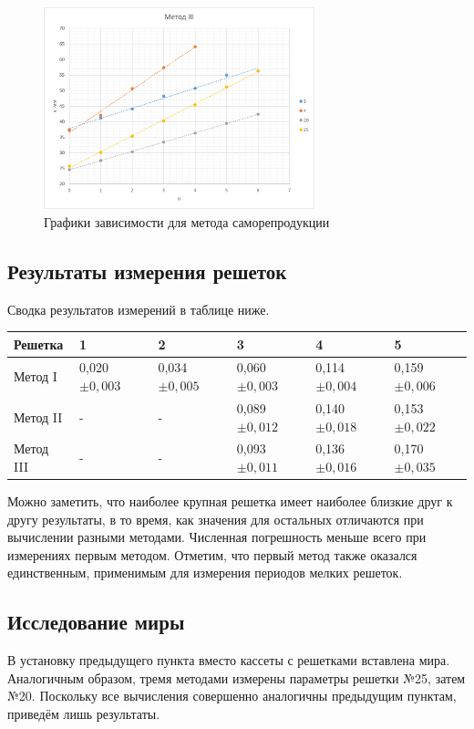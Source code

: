 \begin{figure}[H]
    \centering
    \includegraphics[width=0.7\textwidth]{img/plot.png}
    \caption{Графики зависимости для метода саморепродукции}
    \label{fig:plot}
\end{figure}

\subsection{Результаты измерения решеток}
Сводка результатов измерений в таблице ниже. 

\begin{table}[!ht]
    \centering
    \begin{tabular}{|l|l|l|l|l|l|}
    \hline
        Решетка & 1 & 2 & 3 & 4 & 5 \\ \hline
        Метод I & 0,020$\pm0,003$ & 0,034$\pm0,005$ & 0,060$\pm0,003$ & 0,114$\pm0,004$ & 0,159$\pm0,006$ \\ \hline
        Метод II & - & - & 0,089$\pm0,012$ & 0,140$\pm0,018$  & 0,153$\pm0,022$ \\ \hline
        Метод III & - & - & 0,093$\pm0,011$ & 0,136$\pm0,016$ & 0,170$\pm0,035$ \\ \hline
    \end{tabular}
\end{table}

Можно заметить, что наиболее крупная решетка имеет наиболее близкие друг к другу результаты, в то время, как значения для остальных отличаются при вычислении разными методами. Численная погрешность меньше всего при измерениях первым методом. Отметим, что первый метод также оказался единственным, применимым для измерения периодов мелких решеток.

\subsection{Исследование миры}
В установку предыдущего пункта вместо кассеты с решетками вставлена мира. Аналогичным образом, тремя методами измерены параметры решетки №25, затем №20. Поскольку все вычисления совершенно аналогичны предыдущим пунктам, приведём лишь результаты.

